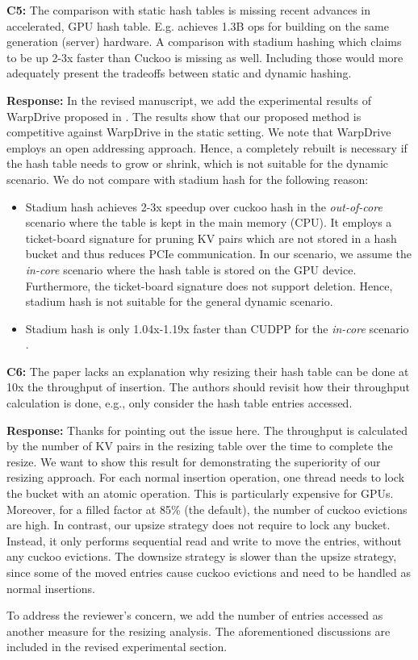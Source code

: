 \begin{shaded}
	\noindent\textbf{C5:} The comparison with static hash tables is missing recent advances in accelerated, GPU hash table. E.g. \cite{junger2018warpdrive} achieves 1.3B ops for building on the same generation (server) hardware. A comparison with stadium hashing \cite{khorasani2015stadium} which claims to be up 2-3x faster than Cuckoo is missing as well. Including those would more adequately present the tradeoffs between static and dynamic hashing.
\end{shaded}
%
\noindent\textbf{Response:} 
In the revised manuscript, we add the experimental results of WarpDrive proposed in \cite{junger2018warpdrive}. 
The results show that our proposed method is competitive against WarpDrive in the static setting. 
We note that WarpDrive employs an open addressing approach. Hence, a completely rebuilt is necessary if the hash table needs to grow or shrink, which is not suitable for the dynamic scenario. 
We do not compare with stadium hash \cite{khorasani2015stadium} for the following reason:
\begin{itemize}
	\item Stadium hash achieves 2-3x speedup over cuckoo hash in the \emph{out-of-core} scenario where the table is kept in the main memory (CPU). It employs a ticket-board signature for pruning KV pairs which are not stored in a hash bucket and thus reduces PCIe communication. In our scenario, we assume the \emph{in-core} scenario where the hash table is stored on the GPU device. Furthermore, the ticket-board signature does not support deletion. Hence, stadium hash is not suitable for the general dynamic scenario. 
	\item Stadium hash is only 1.04x-1.19x faster than CUDPP for the \emph{in-core} scenario \cite{khorasani2015stadium}. 
\end{itemize}



\begin{shaded}
	\noindent\textbf{C6:} The paper lacks an explanation why resizing their hash table can be done at 10x the throughput of insertion. The authors should revisit how their throughput calculation is done, e.g., only consider the hash table entries accessed.
\end{shaded}
%
\noindent\textbf{Response:}
Thanks for pointing out the issue here. The throughput is calculated by the number of KV pairs in the resizing table over the time to complete the resize. 
We want to show this result for demonstrating the superiority of our resizing approach. 
For each normal insertion operation, one thread needs to lock the bucket with an atomic operation. This is particularly expensive for GPUs. Moreover, for a filled factor at 85\% (the default), the number of cuckoo evictions are high. In contrast, our upsize strategy does not require to lock any bucket. Instead, it only performs sequential read and write to move the entries, without any cuckoo evictions. The downsize strategy is slower than the upsize strategy, since some of the moved entries cause cuckoo evictions and need to be handled as normal insertions. 

To address the reviewer's concern, we add the number of entries accessed as another measure for the resizing analysis. 
The aforementioned discussions are included in the revised experimental section.
